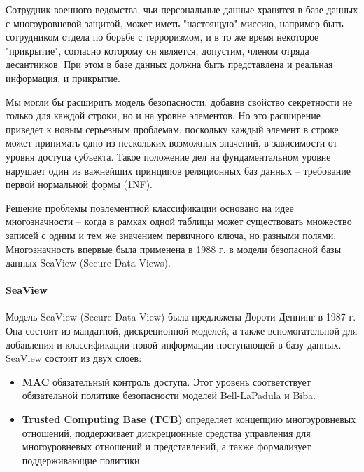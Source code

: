 Сотрудник военного ведомства, чьи персональные данные хранятся в базе данных с многоуровневой защитой, может иметь "настоящую" миссию, например быть сотрудником отдела по борьбе с терроризмом, и в то же время некоторое "прикрытие", согласно которому он является, допустим, членом отряда десантников. При этом в базе данных должна быть представлена и реальная информация, и прикрытие. 

Мы могли бы расширить модель безопасности, добавив свойство секретности не только для каждой строки, но и на уровне элементов. Но это расширение приведет к новым серьезным проблемам, поскольку каждый элемент в строке может принимать одно из нескольких возможных значений, в зависимости от уровня доступа субъекта. Такое положение дел на фундаментальном уровне нарушает один из важнейших принципов реляционных баз данных – требование первой нормальной формы (1NF)\footnotemark. 


Решение проблемы поэлементной классификации основано на идее многозначности --  когда в рамках одной таблицы может существовать множество записей с одним и тем же значением первичного ключа, но разными полями.  Многозначность впервые была применена в 1988 г. в модели безопасной базы данных SeaView (Secure Data Views).  

\paragraph{SeaView}

Модель SeaView (Secure Data View) \autocite{SeaView} была предложена Дороти Деннинг в 1987 г. Она состоит из мандатной, дискреционной моделей, а также вспомогательной для добавления и классификации новой информации поступающей в базу данных. SeaView состоит из двух слоев:

\begin{itemize}
    \item \textbf{MAC}
    обязательный контроль доступа. Этот уровень соответствует обязательной политике безопасности моделей Bell-LaPadula и Biba.
    \item \textbf{Trusted Computing Base (TCB)}
    определяет концепцию многоуровневых отношений, поддерживает дискреционные средства управления для многоуровневых отношений и представлений, а также формализует поддерживающие политики.
\end{itemize}

